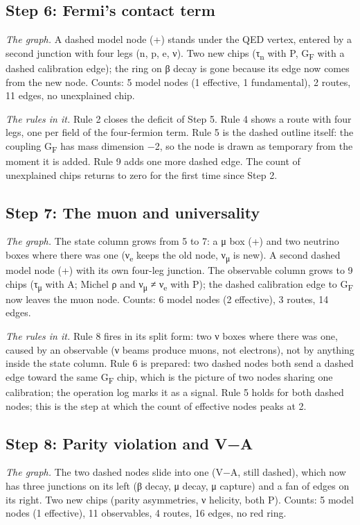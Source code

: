 \subsection*{Step 6: Fermi's contact term}
\noindent\emph{The graph.} A dashed model node (+) stands under the QED vertex, entered by a second junction with four legs (n, p, e, ν). Two new chips (τ\textsubscript{n} with P, G\textsubscript{F} with a dashed calibration edge); the ring on β decay is gone because its edge now comes from the new node. Counts: 5 model nodes (1 effective, 1 fundamental), 2 routes, 11 edges, no unexplained chip.

\noindent\emph{The rules in it.} Rule 2 closes the deficit of Step 5. Rule 4 shows a route with four legs, one per field of the four-fermion term. Rule 5 is the dashed outline itself: the coupling G\textsubscript{F} has mass dimension −2, so the node is drawn as temporary from the moment it is added. Rule 9 adds one more dashed edge. The count of unexplained chips returns to zero for the first time since Step 2.

\subsection*{Step 7: The muon and universality}
\noindent\emph{The graph.} The state column grows from 5 to 7: a μ box (+) and two neutrino boxes where there was one (ν\textsubscript{e} keeps the old node, ν\textsubscript{μ} is new). A second dashed model node (+) with its own four-leg junction. The observable column grows to 9 chips (τ\textsubscript{μ} with A; Michel ρ and ν\textsubscript{μ} ≠ ν\textsubscript{e} with P); the dashed calibration edge to G\textsubscript{F} now leaves the muon node. Counts: 6 model nodes (2 effective), 3 routes, 14 edges.

\noindent\emph{The rules in it.} Rule 8 fires in its split form: two ν boxes where there was one, caused by an observable (ν beams produce muons, not electrons), not by anything inside the state column. Rule 6 is prepared: two dashed nodes both send a dashed edge toward the same G\textsubscript{F} chip, which is the picture of two nodes sharing one calibration; the operation log marks it as a signal. Rule 5 holds for both dashed nodes; this is the step at which the count of effective nodes peaks at 2.

\subsection*{Step 8: Parity violation and V−A}
\noindent\emph{The graph.} The two dashed nodes slide into one (V−A, still dashed), which now has three junctions on its left (β decay, μ decay, μ capture) and a fan of edges on its right. Two new chips (parity asymmetries, ν helicity, both P). Counts: 5 model nodes (1 effective), 11 observables, 4 routes, 16 edges, no red ring.

